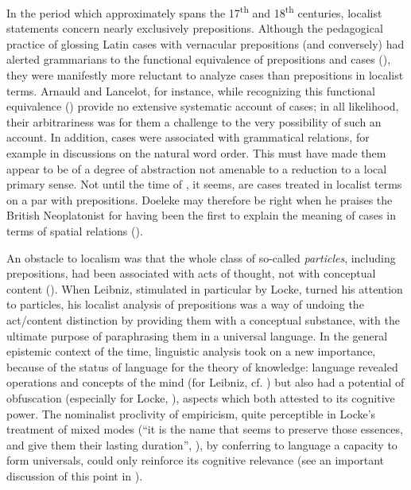 \documentclass[english,output=paper,colorlinks,citecolor=brown]{../langscibook}
\begin{document}
In the period which approximately spans the 17\textsuperscript{th} and 18\textsuperscript{th} centuries, localist statements concern nearly exclusively prepositions. Although the pedagogical practice of glossing Latin cases with vernacular prepositions (and conversely) had alerted grammarians to the functional equivalence of prepositions and cases (\citealt[26]{ColombatEtAl2010}), they were manifestly more reluctant to analyze cases than prepositions in localist terms. Arnauld and Lancelot, for instance, while recognizing this functional equivalence (\citealt[62]{ArnauldLancelot1969}) provide no extensive systematic account of cases; in all likelihood, their arbitrariness was for them a challenge to the very possibility of such an account. In addition, cases were associated with grammatical relations, for example in discussions on the natural word order. This must have made them appear to be of a degree of abstraction not amenable to a reduction to a local primary sense. Not until the time of \citet{Harris1773}, it seems, are cases treated in localist terms on a par with prepositions. Doeleke may therefore be right when he praises the British Neoplatonist for having been the first to explain the meaning of cases in terms of spatial relations (\citeyear[7]{Doeleke1814}).

An obstacle to localism was that the whole class of so-called \textit{particles}, including prepositions, had been associated with acts of thought, not with conceptual content (\citealt{Nuchelmans1986}). When Leibniz, stimulated in particular by Locke, turned his attention to particles, his localist analysis of prepositions was a way of undoing the act\slash content distinction by providing them with a conceptual substance, with the ultimate purpose of paraphrasing them in a universal language. In the general epistemic context of the time, linguistic analysis took on a new importance, because of the status of language for the theory of knowledge: language revealed operations and concepts of the mind (for Leibniz, cf. \citealt{Dascal1990}) but also had a potential of obfuscation (especially for Locke, \citealt{Dawson2007}), aspects which both attested to its cognitive power. The nominalist proclivity of empiricism, quite perceptible in Locke’s treatment of mixed modes (“it is the name that seems to preserve those essences, and give them their lasting duration”, \citealt[434]{Locke1975}), by conferring to language a capacity to form universals, could only reinforce its cognitive relevance (see an important discussion of this point in \citealt{Formigari1988}).
\end{document}
